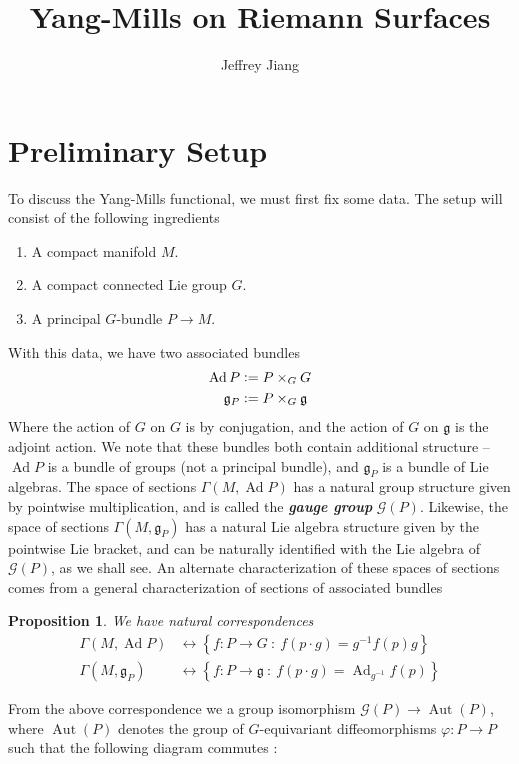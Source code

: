 \documentclass[psamsfonts, 12pt]{amsart}
\newtheorem{prop}[thm]{Proposition}
\theoremstyle{definition}
\theoremstyle{remark}
\newcommand{\ib}[1]{\textbf{\textit{#1}}}
\newcommand{\g}{\mathfrak{g}}
\newcommand{\inv}{^{-1}}
\newcommand{\set}[1]{\left\lbrace #1 \right\rbrace}
\newcommand{\defeq}{\vcentcolon=}
\DeclareMathOperator{\Aut}{Aut}
\DeclareMathOperator{\Ad}{Ad}
\begin{document}
%
\author{Jeffrey Jiang}
%
\title{Yang-Mills on Riemann Surfaces}
%
\maketitle
%
\tableofcontents
%
\section{Preliminary Setup}
%
To discuss the Yang-Mills functional, we must first fix some data. The setup will
consist of the following ingredients
\begin{enumerate}
  \item A compact manifold $M$.
  \item A compact connected Lie group $G$.
  \item A principal $G$-bundle $P \to M$.
\end{enumerate}
%
With this data, we have two associated bundles
\begin{align*}
\Ad P &\defeq P \times_G G \\
\g_P &\defeq P \times_G \g
\end{align*}
%
Where the action of $G$ on $G$ is by conjugation, and the action of $G$ on $\g$
is the adjoint action. We note that these bundles both contain additional structure --
$\Ad P$ is a bundle of groups (not a principal bundle), and $\g_P$ is a bundle of Lie
algebras. The space of sections $\Gamma(M, \Ad P)$ has
a natural group structure given by pointwise multiplication, and is called the
\ib{gauge group} $\mathscr{G}(P)$. Likewise, the space of sections
$\Gamma(M, \g_P)$ has a natural Lie algebra structure given by the pointwise Lie
bracket, and can be naturally identified with the Lie algebra of $\mathscr{G}(P)$,
as we shall see. An alternate characterization of these spaces of sections comes from
a general characterization of sections of associated bundles
%
\begin{prop}
We have natural correspondences
\begin{align*}
\Gamma(M, \Ad P) &\longleftrightarrow \set{f : P \to G ~:~ f(p\cdot g) = g\inv f(p)g} \\
\Gamma(M, \g_P) &\longleftrightarrow \set{f : P \to \g ~:~ f(p\cdot g) = \Ad_{g\inv}f(p)}
\end{align*}
\end{prop}
%
From the above correspondence we a group isomorphism
$\mathscr{G}(P) \to \Aut(P)$, where $\Aut(P)$ denotes the group of
$G$-equivariant diffeomorphisms $\varphi : P \to P$ such that
the following diagram commutes :
\end{document}
